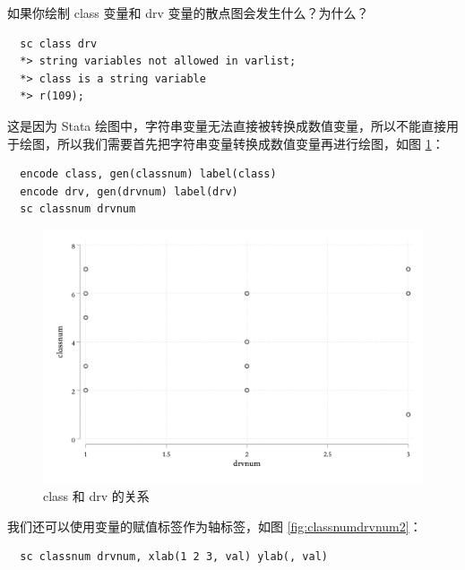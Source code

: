 \begin{exercise}
  如果你绘制 class 变量和 drv 变量的散点图会发生什么？为什么？
\end{exercise}

\begin{solution}
  \begin{lstlisting}
  sc class drv
  *> string variables not allowed in varlist;
  *> class is a string variable
  *> r(109);
  \end{lstlisting}

  这是因为 Stata 绘图中，字符串变量无法直接被转换成数值变量，所以不能直接用于绘图，所以我们需要首先把字符串变量转换成数值变量再进行绘图，如图 \ref{fig:classnumdrvnum}：

  \begin{lstlisting}
  encode class, gen(classnum) label(class)
  encode drv, gen(drvnum) label(drv)
  sc classnum drvnum
  \end{lstlisting}

  \begin{figure}[htbp]
    \centering
    \includegraphics[width=\textwidth]{assets/classnumdrvnum.png}
    \caption{class 和 drv 的关系}
    \label{fig:classnumdrvnum}
  \end{figure}

  我们还可以使用变量的赋值标签作为轴标签，如图 \ref{fig:classnumdrvnum2}：

  \begin{lstlisting}
  sc classnum drvnum, xlab(1 2 3, val) ylab(, val)
  \end{lstlisting}


\end{solution}
